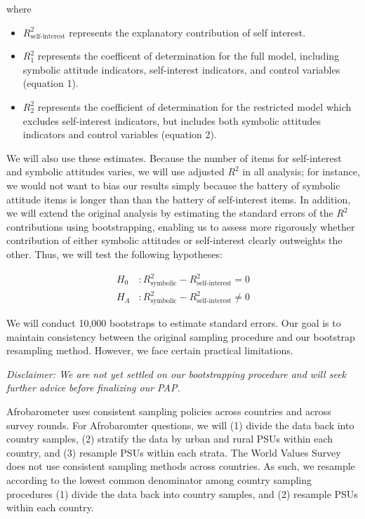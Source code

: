 \documentclass[]{article}
\begin{document}
where

\begin{itemize}
  \item $R^2_{\text{self-interest}}$ represents the explanatory contribution of self interest.
  \item $R^2_1$ represents the coefficent of determination for the full model, including symbolic attitude indicators, self-interest indicators, and control variables (equation 1).
  \item $R^2_2$ represents the coefficient of determination for the restricted model which excludes self-interest indicators, but includes both symbolic attitudes indicators and control variables (equation 2).
\end{itemize}

We will also use these estimates. Because the number of items for
self-interest and symbolic attitudes varies, we will use adjusted
\(R^2\) in all analysis; for instance, we would not want to bias our
results simply because the battery of symbolic attitude items is longer
than than the battery of self-interest items. In addition, we will
extend the original analysis by estimating the standard errors of the
\(R^2\) contributions using bootstrapping, enabling us to assess more
rigorously whether contribution of either symbolic attitudes or
self-interest clearly outweights the other. Thus, we will test the
following hypotheses:

\[\begin{aligned}
H_0 \ &: R^2_{\text{symbolic}} - R^2_{\text{self-interest}} = 0\\ H_A&: R^2_{\text{symbolic}} - R^2_{\text{self-interest}} \neq 0
\end{aligned}\]

We will conduct 10,000 bootstraps to estimate standard errors. Our goal
is to maintain consistency between the original sampling procedure and
our bootstrap resampling method. However, we face certain practical
limitations.

\textit{Disclaimer: We are not yet settled on our bootstrapping procedure and will seek further advice before finalizing our PAP.}

Afrobarometer uses consistent sampling policies across countries and
across survey rounds. For Afrobaromter questions, we will (1) divide the
data back into country samples, (2) stratify the data by urban and rural
PSUs within each country, and (3) resample PSUs within each strata. The
World Values Survey does not use consistent sampling methods across
countries. As such, we resample according to the lowest common
denominator among country sampling procedures (1) divide the data back
into country samples, and (2) resample PSUs within each country.
\end{document}
